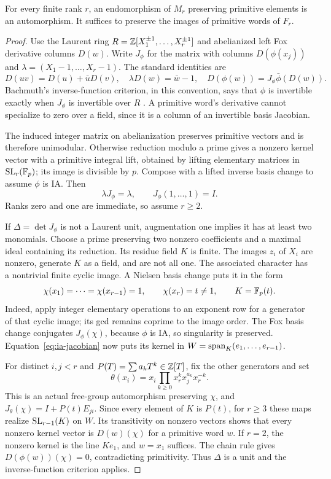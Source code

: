 \begin{theorem}\label{prop:m0}
For every finite rank $r$, an endomorphism of $M_r$ preserving primitive
elements is an automorphism. It suffices to preserve the images of
primitive words of $F_r$.
\end{theorem}
\begin{proof}
Use the Laurent ring $R=\mathbb Z[X_1^{\pm1},\ldots,X_r^{\pm1}]$ and
abelianized left Fox derivative columns $D(w)$. Write $J_\phi$ for
the matrix with columns $D(\phi(x_j))$ and
$\lambda=(X_1-1,\ldots,X_r-1)$. The standard identities are
\[
 D(uv)=D(u)+\bar uD(v),\quad \lambda D(w)=\bar w-1,
 \quad D(\phi(w))=J_\phi\bar\phi(D(w)).
\]
Bachmuth's inverse-function criterion, in this convention, says that
$\phi$ is invertible exactly when $J_\phi$ is invertible over $R$
\cite[Lemma 1]{ggr}. A primitive word's derivative cannot specialize
to zero over a field, since it is a column of an invertible basis
Jacobian.

The induced integer matrix on abelianization preserves primitive
vectors and is therefore unimodular. Otherwise reduction modulo a
prime gives a nonzero kernel vector with a primitive integral lift,
obtained by lifting elementary matrices in $\operatorname{SL}_r(\mathbb F_p)$; its image
is divisible by $p$. Compose with a lifted inverse basis change to
assume $\phi$ is IA. Then
\begin{equation}\label{eq:ia-jacobian}
 \lambda J_\phi=\lambda,\qquad J_\phi(1,\ldots,1)=I.
\end{equation}
Ranks zero and one are immediate, so assume $r\ge2$.

If $\Delta=\det J_\phi$ is not a Laurent unit, augmentation one
implies it has at least two monomials. Choose a prime preserving two
nonzero coefficients and a maximal ideal containing its reduction.
Its residue field $K$ is finite. The images $z_i$ of $X_i$ are
nonzero, generate $K$ as a field, and are not all one. The associated
character has a nontrivial finite cyclic image. A Nielsen basis change
puts it in the form
\[
 \chi(x_1)=\cdots=\chi(x_{r-1})=1,\qquad
 \chi(x_r)=t\ne1,\qquad K=\mathbb F_p(t).
\]
Indeed, apply integer elementary operations to an exponent row for
a generator of that cyclic image; its gcd remains coprime to the
image order. The Fox basis change conjugates $J_\phi(\chi)$,
because $\phi$ is IA, so singularity is preserved. Equation~\eqref{eq:ia-jacobian}
now puts its kernel in $W=\operatorname{span}_K(e_1,\ldots,e_{r-1})$.

For distinct $i,j<r$ and $P(T)=\sum a_kT^k\in\mathbb Z[T]$, fix the
other generators and set
\begin{equation}\label{eq:m0-transvection}
 \theta(x_i)=x_i\prod_{k\ge0}x_r^kx_j^{a_k}x_r^{-k}.
\end{equation}
This is an actual free-group automorphism preserving $\chi$, and
$J_\theta(\chi)=I+P(t)E_{ji}$. Since every element of $K$ is
$P(t)$, for $r\ge3$ these maps realize $\operatorname{SL}_{r-1}(K)$ on $W$.
Its transitivity on nonzero vectors shows that every nonzero kernel
vector is $D(w)(\chi)$ for a primitive word $w$. If $r=2$, the
nonzero kernel is the line $Ke_1$, and $w=x_1$ suffices.
The chain rule gives $D(\phi(w))(\chi)=0$, contradicting primitivity.
Thus $\Delta$ is a unit and the inverse-function criterion applies.
\end{proof}

